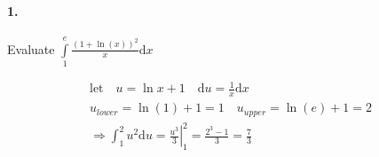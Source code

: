


\renewcommand\assignment{Homework Set III, Due Friday, January 27th, 2023}


    \iffalse
    \begin{equation*}
        \begin{gathered}
            Equations go here.
        \end{gathered}
    \end{equation*}

    \resizebox{\hsize}{!}{$Long equation goes here$}

    \begin{multicol*}{# of columns}
    \end{multicol*}

    \horizontal

    \fi


    \paragraph*{1.}
    Evaluate $\int\limits_{1}^{e}\frac{(1+\ln(x))^2}{x}\mathrm{d}x$

    \begin{mdframed}
        \begin{equation*}
            \begin{gathered}
                \text{let} \quad u = \ln x + 1 \quad \mathrm{d}u = \frac{1}{x}\mathrm{d}x    \\
                u_{lower} = \ln(1) + 1 = 1 \quad u_{upper} = \ln(e) + 1 = 2 \\
                \Rightarrow \int_{1}^{2}u^2\mathrm{d}u = \left.\frac{u^3}{3}\right|_{1}^{2} = \frac{2^3 - 1}{3} = \boxed{\frac{7}{3}}
            \end{gathered}
        \end{equation*}
    \end{mdframed}

